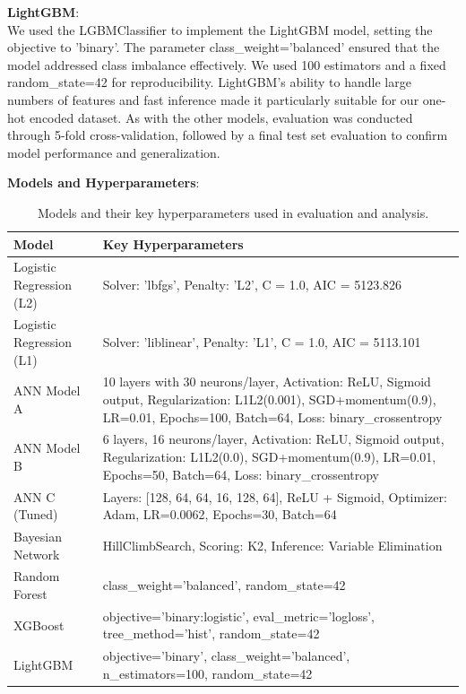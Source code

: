 \documentclass[conference]{IEEEtran}
\begin{document}
\noindent
\textbf{LightGBM}:\\
We used the LGBMClassifier to implement the LightGBM model, setting the objective to 'binary'. The parameter class\_weight='balanced' ensured that the model addressed class imbalance effectively. We used 100 estimators and a fixed random\_state=42 for reproducibility. LightGBM’s ability to handle large numbers of features and fast inference made it particularly suitable for our one-hot encoded dataset. As with the other models, evaluation was conducted through 5-fold cross-validation, followed by a final test set evaluation to confirm model performance and generalization.

\vspace{1em}

\textbf{Models and Hyperparameters}:

\begin{table}[htbp]
  \centering
  \renewcommand{\arraystretch}{1.3}
  \begin{tabular}{|p{3.5cm}|p{3cm}|}
    \hline
    \textbf{Model} & \textbf{Key Hyperparameters} \\
    \hline
    Logistic Regression (L2) & Solver: 'lbfgs', Penalty: 'L2', C = 1.0, AIC = 5123.826 \\
    \hline
    Logistic Regression (L1) & Solver: 'liblinear', Penalty: 'L1', C = 1.0, AIC = 5113.101 \\
    \hline
    ANN Model A & 10 layers with 30 neurons/layer, Activation: ReLU, Sigmoid output, Regularization: L1L2(0.001), SGD+momentum(0.9), LR=0.01, Epochs=100, Batch=64, Loss: binary\_crossentropy \\
    \hline
    ANN Model B & 6 layers, 16 neurons/layer, Activation: ReLU, Sigmoid output, Regularization: L1L2(0.0), SGD+momentum(0.9), LR=0.01, Epochs=50, Batch=64, Loss: binary\_crossentropy \\
    \hline
    ANN C (Tuned) & Layers: [128, 64, 64, 16, 128, 64], ReLU + Sigmoid, Optimizer: Adam, LR=0.0062, Epochs=30, Batch=64 \\
    \hline
    Bayesian Network & HillClimbSearch, Scoring: K2, Inference: Variable Elimination \\
    \hline
    Random Forest & class\_weight='balanced', random\_state=42 \\
    \hline
    XGBoost & objective='binary:logistic', eval\_metric='logloss', tree\_method='hist', random\_state=42 \\
    \hline
    LightGBM & objective='binary', class\_weight='balanced', n\_estimators=100, random\_state=42 \\
    \hline
  \end{tabular}
  \caption{Models and their key hyperparameters used in evaluation and analysis.}
  \label{tab:model_params}
\end{table}
\end{document}
